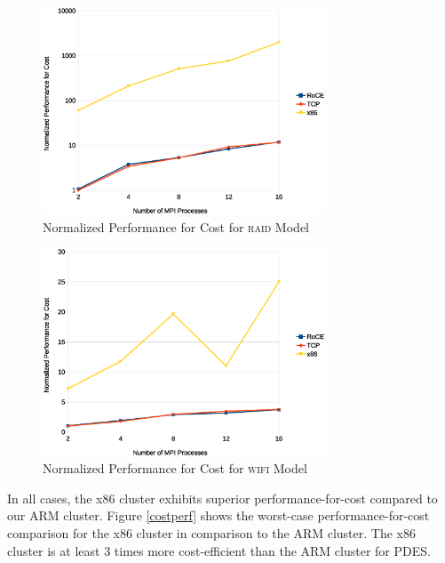 \documentclass[11pt]{book}
\begin{document}
\begin{figure}
\centering
\includegraphics[width=0.75\textwidth]{raid_costperf}
\caption{Normalized Performance for Cost for \textsc{raid} Model}
\label{raid-costperf}
\end{figure}

\begin{figure}
\centering
\includegraphics[width=0.75\textwidth]{wifi_costperf}
\caption{Normalized Performance for Cost for \textsc{wifi} Model}
\label{wifi-costperf}
\end{figure}

In all cases, the x86 cluster exhibits superior performance-for-cost compared to
our ARM cluster. Figure \ref{costperf} shows the worst-case
performance-for-cost comparison for the x86 cluster in comparison to the ARM
cluster. The x86 cluster is at least 3 times more cost-efficient than the ARM
cluster for PDES.
\end{document}

